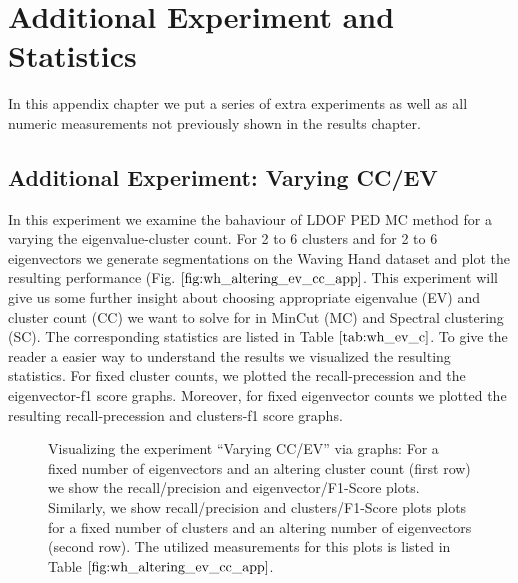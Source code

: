 \chapter{Additional Experiment and Statistics}
\label{chap:additional_exp}
In this appendix chapter we put a series of extra experiments as well as all numeric measurements not previously shown in the results chapter.

\section{Additional Experiment: Varying CC/EV}
\label{sec:additional_cc_ev_exp}
In this experiment we examine the bahaviour of LDOF PED MC method for a varying the eigenvalue-cluster count. For 2 to 6 clusters and for 2 to 6 eigenvectors we generate segmentations on the Waving Hand dataset and plot the resulting performance (Fig. $\ref{fig:wh_altering_ev_cc_app}$. This experiment will give us some further insight about choosing appropriate eigenvalue (EV) and cluster count (CC) we want to solve for in MinCut (MC) and Spectral clustering (SC). The corresponding statistics are listed in Table $\ref{tab:wh_ev_c}$. To give the reader a easier way to understand the results we visualized the resulting statistics. For fixed cluster counts, we plotted the recall-precession and the eigenvector-f1 score graphs. Moreover, for fixed eigenvector counts we plotted the resulting recall-precession and clusters-f1 score graphs. 
\begin{figure}[H]
\begin{center}
\end{center}
\caption[Plot Performance Varying CLusters/Eigenvectors]{Visualizing the experiment \enquote{Varying CC/EV} via graphs: For a fixed number of eigenvectors and an altering cluster count (first row) we show the recall/precision and eigenvector/F1-Score plots. Similarly, we show recall/precision and clusters/F1-Score plots plots for a fixed number of clusters and an altering number of eigenvectors (second row). The utilized measurements for this plots is listed in Table $\ref{fig:wh_altering_ev_cc_app}$.}
\label{fig:wh_altering_ev_cc_app}
\end{figure}

